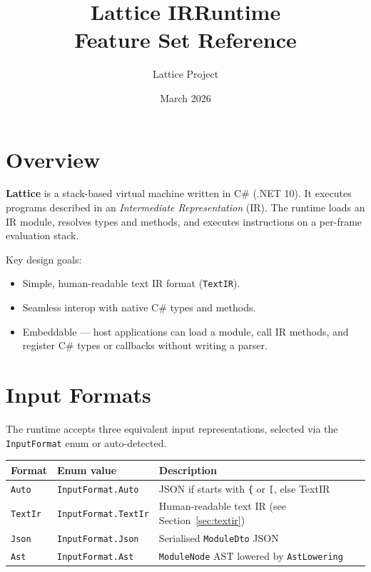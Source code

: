 \documentclass[11pt,a4paper]{article}
\title{\textbf{Lattice IRRuntime}\\\large Feature Set Reference}
\author{Lattice Project}
\date{March 2026}
\begin{document}
\maketitle
\tableofcontents
\newpage

\section{Overview}

\textbf{Lattice} is a stack-based virtual machine written in C\# (.NET 10).
It executes programs described in an \emph{Intermediate Representation} (IR).
The runtime loads an IR module, resolves types and methods, and executes
instructions on a per-frame evaluation stack.

Key design goals:
\begin{itemize}
  \item Simple, human-readable text IR format (\texttt{TextIR}).
  \item Seamless interop with native C\# types and methods.
  \item Embeddable --- host applications can load a module, call IR methods,
        and register C\# types or callbacks without writing a parser.
\end{itemize}

\section{Input Formats}

The runtime accepts three equivalent input representations, selected via
the \texttt{InputFormat} enum or auto-detected.

\begin{center}
\begin{tabular}{lll}
\toprule
\textbf{Format} & \textbf{Enum value} & \textbf{Description} \\
\midrule
\texttt{Auto}   & \texttt{InputFormat.Auto}   & JSON if starts with \texttt{\{} or \texttt{[}, else TextIR \\
\texttt{TextIr} & \texttt{InputFormat.TextIr} & Human-readable text IR (see Section~\ref{sec:textir}) \\
\texttt{Json}   & \texttt{InputFormat.Json}   & Serialised \texttt{ModuleDto} JSON \\
\texttt{Ast}    & \texttt{InputFormat.Ast}    & \texttt{ModuleNode} AST lowered by \texttt{AstLowering} \\
\bottomrule
\end{tabular}
\end{center}
\end{document}
